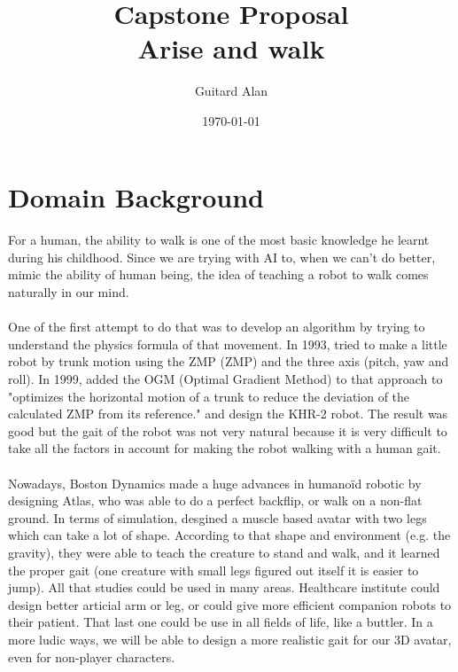 \documentclass{article}
\title{\textbf{Capstone Proposal}\\Arise and walk}
\date{\today}
\author{Guitard Alan}
\begin{document}
\raggedright
\maketitle	
\section{Domain Background}
\paragraph{}
  For a human, the ability to walk is one of the most basic knowledge he learnt
  during his childhood. Since we are trying with AI to, when we can't do better,
  mimic the ability of human being, the idea of teaching a robot to walk comes
  naturally in our mind.
  \paragraph{}
  One of the first attempt to do that was to develop an algorithm by trying to
  understand the physics formula of that movement. In 1993,
  \citet{1993-TrunkMotion} tried to make a little robot by trunk motion
  using the ZMP (\gls{ZMP}) and the three
  axis (pitch, yaw and roll)\cite{1993-TrunkMotion}. In 1999, \citeauthor{1999-KHR-2}
  added the OGM (Optimal Gradient Method) to that approach
  to "optimizes the horizontal motion of a trunk to reduce the
  deviation of the calculated ZMP from its
  reference." \cite{1999-KHR-2} and design the KHR-2 robot.
  The result was good but the gait of the robot was not very natural because
  it is very difficult to take all the factors in account for making
  the robot walking with a human gait.
  \paragraph{}
  Nowadays, Boston Dynamics made a huge advances in humanoïd robotic by
  designing Atlas\cite{doi:10.1002/rob.21559}, who was able to do a perfect backflip, or walk on a non-flat
  ground. In terms of simulation, \citeauthor{2013-TOG-MuscleBasedBipeds}
  desgined a muscle based avatar with two legs which can take a lot of shape.
  According to that shape and environment (e.g. the gravity), they were able to
  teach the creature to stand and walk, and it learned the proper gait (one
  creature with small legs figured out itself it is easier to
  jump).\cite{2013-TOG-MuscleBasedBipeds}
  All that studies could be used in many areas. Healthcare institute could
  design better articial arm or leg, or could give more efficient companion
  robots to their patient. That last one could be use in all fields of life,
  like a buttler. In a more ludic ways, we will be able to design a more
  realistic gait for our 3D avatar, even for non-player characters. 
  
\end{document}
